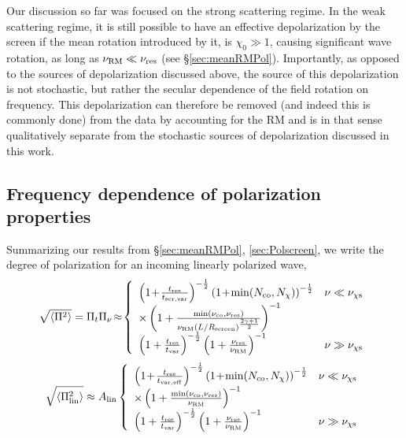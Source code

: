 \documentclass[fleqn,usenatbib]{mnras}
\begin{document}
	Our discussion so far was focused on the strong scattering regime. In the weak scattering regime, it is still possible to have an effective depolarization by the screen if the mean rotation introduced by it, is $\chi_0 \gg 1$, causing significant wave rotation, as long as $\nu_{\rm RM}\ll \nu_{\rm res}$ (see \S \ref{sec:meanRMPol}). Importantly, as opposed to the sources of depolarization discussed above, the source of this depolarization is not stochastic, but rather the secular dependence of the field rotation on frequency. This depolarization can therefore be removed (and indeed this is commonly done) from the data by accounting for the RM and is in that sense qualitatively separate from the stochastic sources of depolarization discussed in this work.
	
	\subsection{Frequency dependence of polarization properties}
	\label{sec:Polsummary}
	Summarizing our results from \S \ref{sec:meanRMPol}, \ref{sec:Polscreen}, we write the degree of polarization for an incoming linearly polarized wave,
	\begin{equation}
		\label{eq:Pisummarizetot}
		\sqrt{\langle \Pi^2\rangle}=\Pi_t \Pi_{\nu}\!\approx \!\left\{ \begin{array}{ll} \left(1\!+\!\frac{t_{\rm res}}{t_{\rm scr,var}}\right)^{-{1\over 2}} \left(1\!+\!\min(N_{\rm co},N_{\chi})\right)^{-{1\over 2}}& \nu\ll \nu_{\rm \chi s}\\ \times \left(1+\frac{\min(\nu_{\rm co},\nu_{\rm res})}{\nu_{\rm RM} (L/R_{\rm screen})^{2\gamma+1\over 2}}\right)^{-1}& \\  \left(1+\frac{t_{\rm res}}{t_{\rm var}}\right)^{-{1\over 2}} \left(1+\frac{\nu_{\rm res}}{\nu_{\rm RM}}\right)^{-1} & \nu\gg \nu_{\rm \chi s}
		\end{array} \right. 
	\end{equation}
	\begin{equation}
		\label{eq:Pisummarizelin}
		\sqrt{\langle \Pi_{\rm lin}^2\rangle}\approx A_{\rm lin}\left\{ \begin{array}{ll} \left(1\!+\!\frac{t_{\rm res}}{t_{\rm var,eff}}\right)^{-{1\over 2}} \left(1\!+\!\min(N_{\rm co},N_{\chi})\right)^{-{1\over 2}}& \nu\ll \nu_{\rm \chi s}\\ \times \left(1+\frac{\min(\nu_{\rm co},\nu_{\rm res})}{\nu_{\rm RM}}\right)^{-1}& \\  \left(1+\frac{t_{\rm res}}{t_{\rm var}}\right)^{-{1\over 2}} \left(1+\frac{\nu_{\rm res}}{\nu_{\rm RM}}\right)^{-1} & \nu\gg \nu_{\rm \chi s}
		\end{array} \right. 
	\end{equation}
\end{document}
